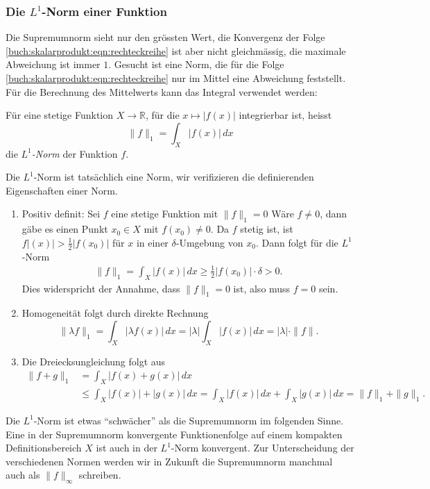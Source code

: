 %
%
\subsubsection{Die $L^1$-Norm einer Funktion}
Die Supremumnorm sieht nur den grössten Wert, die Konvergenz der Folge
\eqref{buch:skalarprodukt:eqn:rechteckreihe} ist aber nicht gleichmässig,
die maximale Abweichung ist immer $1$.
Gesucht ist eine Norm, die für die Folge
\eqref{buch:skalarprodukt:eqn:rechteckreihe} 
nur im Mittel eine Abweichung feststellt.
Für die Berechnung des Mittelwerts kann das Integral verwendet werden:

\begin{definition}[$L^1$-Norm]
\label{buch:skalaprodukt:definition:l1norm}
Für eine stetige Funktion $X\to\mathbb{R}$, für die $x\mapsto |f(x)|$
integrierbar ist, heisst
\begin{equation}
\|f\|_1 = \int_X |f(x)|\,dx
\label{buch:skalarprodukt:eqn:l1norm}
\end{equation}
die {\em $L^1$-Norm} der Funktion $f$.
%
\end{definition}

Die $L^1$-Norm ist tatsächlich eine Norm, wir verifizieren die
definierenden Eigenschaften einer Norm.
\begin{enumerate}
\item
Positiv definit: Sei $f$ eine stetige Funktion mit $\|f\|_1=0$
Wäre $f\ne 0$, dann gäbe es einen Punkt $x_0\in X$ mit $f(x_0) \ne 0$.
Da $f$ stetig ist, ist $f|(x)| > \frac12|f(x_0)|$ für $x$ in einer
$\delta$-Umgebung von $x_0$.
Dann folgt für die $L^1$-Norm
\begin{align*}
\|f\|_1
=
\int_X |f(x)|\,dx
\ge
\frac12 |f(x_0)| \cdot \delta 
> 0.
\end{align*}
Dies widerspricht der Annahme, dass $\|f\|_1=0$ ist, also muss $f=0$ sein.
\item
Homogeneität folgt durch direkte Rechnung
\[
\|\lambda f\|_1
=
\int_X |\lambda f(x)|\,dx
=
|\lambda|
\int_X |f(x)|\,dx
=
|\lambda| \cdot \|f\|.
\]
\item
Die Dreiecksungleichung folgt aus
\begin{align*}
\|f+g\|_1
&=
\int_X |f(x) + g(x)|\,dx
\\
&\le
\int_X |f(x)| + |g(x)|\,dx
=
\int_X |f(x)|\,dx + \int_X |g(x)|\,dx
=
\|f\|_1 + \|g\|_1.
\end{align*}
\end{enumerate}
Die $L^1$-Norm ist etwas ``schwächer'' als die Supremumnorm im
folgenden Sinne.
Eine in der Supremumnorm konvergente Funktionenfolge auf einem
kompakten Definitionsbereich $X$ ist auch in der $L^1$-Norm konvergent.
Zur Unterscheidung der verschiedenen Normen werden wir in Zukunft die
Supremumnorm manchmal auch als $\|f\|_{\infty}$ schreiben.

